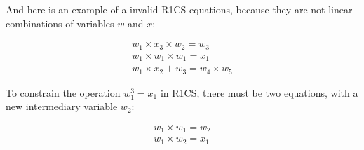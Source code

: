 And here is an example of a invalid R1CS equations, because they are not linear
combinations of variables $w$ and $x$:

\begin{displaymath}
	\begin{array}{l}
		w_1 \times x_3 \times w_2 = w_3	\\
		w_1 \times w_1 \times w_1 = x_1	\\
		w_1 \times x_2 + w_3 = w_4 \times w_5
	\end{array}
\end{displaymath}

To constrain the operation $w_1^3 = x_1$ in R1CS, there must be two equations, with
a new intermediary variable $w_2$:

\begin{displaymath}
	\begin{array}{l}
		w_1 \times w_1 = w_2	\\
		w_1 \times w_2 = x_1
	\end{array}
\end{displaymath}








